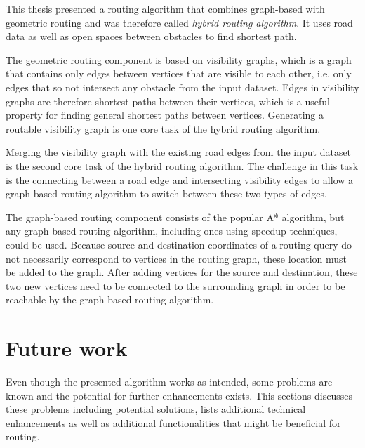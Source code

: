 
This thesis presented a routing algorithm that combines graph-based with geometric routing and was therefore called \emph{hybrid routing algorithm}.
It uses road data as well as open spaces between obstacles to find shortest path.

The geometric routing component is based on visibility graphs, which is a graph that contains only edges between vertices that are visible to each other, i.e. only edges that so not intersect any obstacle from the input dataset.
Edges in visibility graphs are therefore shortest paths between their vertices, which is a useful property for finding general shortest paths between vertices.
Generating a routable visibility graph is one core task of the hybrid routing algorithm.

Merging the visibility graph with the existing road edges from the input dataset is the second core task of the hybrid routing algorithm.
The challenge in this task is the connecting between a road edge and intersecting visibility edges to allow a graph-based routing algorithm to switch between these two types of edges.

The graph-based routing component consists of the popular A* algorithm, but any graph-based routing algorithm, including ones using speedup techniques, could be used.
Because source and destination coordinates of a routing query do not necessarily correspond to vertices in the routing graph, these location must be added to the graph.
After adding vertices for the source and destination, these two new vertices need to be connected to the surrounding graph in order to be reachable by the graph-based routing algorithm.

\section{Future work}
\label{sec:future-work}

	Even though the presented algorithm works as intended, some problems are known and the potential for further enhancements exists.
	This sections discusses these problems including potential solutions, lists additional technical enhancements as well as additional functionalities that might be beneficial for routing.

